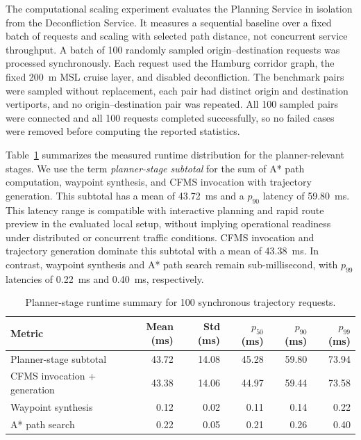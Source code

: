 The computational scaling experiment evaluates the Planning Service in isolation from the Deconfliction Service. It measures a sequential baseline over a fixed batch of requests and scaling with selected path distance, not concurrent service throughput. A batch of 100 randomly sampled origin--destination requests was processed synchronously. Each request used the Hamburg corridor graph, the fixed \SI{200}{m} MSL cruise layer, and disabled deconfliction. The benchmark pairs were sampled without replacement, each pair had distinct origin and destination vertiports, and no origin--destination pair was repeated. All 100 sampled pairs were connected and all 100 requests completed successfully, so no failed cases were removed before computing the reported statistics.

Table~\ref{tab:planner_scalability_runtime} summarizes the measured runtime distribution for the planner-relevant stages. We use the term \emph{planner-stage subtotal} for the sum of A* path computation, waypoint synthesis, and CFMS invocation with trajectory generation. This subtotal has a mean of \SI{43.72}{ms} and a \(p_{90}\) latency of \SI{59.80}{ms}. This latency range is compatible with interactive planning and rapid route preview in the evaluated local setup, without implying operational readiness under distributed or concurrent traffic conditions. CFMS invocation and trajectory generation dominate this subtotal with a mean of \SI{43.38}{ms}. In contrast, waypoint synthesis and A* path search remain sub-millisecond, with \(p_{99}\) latencies of \SI{0.22}{ms} and \SI{0.40}{ms}, respectively.

\begin{table}[H]
  \centering
  \caption{Planner-stage runtime summary for 100 synchronous trajectory requests.}
  \label{tab:planner_scalability_runtime}
  \begin{tabular}{lrrrrr}
    \toprule
    Metric & Mean (ms) & Std (ms) & \(p_{50}\) (ms) & \(p_{90}\) (ms) & \(p_{99}\) (ms) \\
    \midrule
    Planner-stage subtotal & 43.72 & 14.08 & 45.28 & 59.80 & 73.94 \\
    CFMS invocation + generation & 43.38 & 14.06 & 44.97 & 59.44 & 73.58 \\
    Waypoint synthesis & 0.12 & 0.02 & 0.11 & 0.14 & 0.22 \\
    A* path search & 0.22 & 0.05 & 0.21 & 0.26 & 0.40 \\
    \bottomrule
  \end{tabular}
\end{table}

